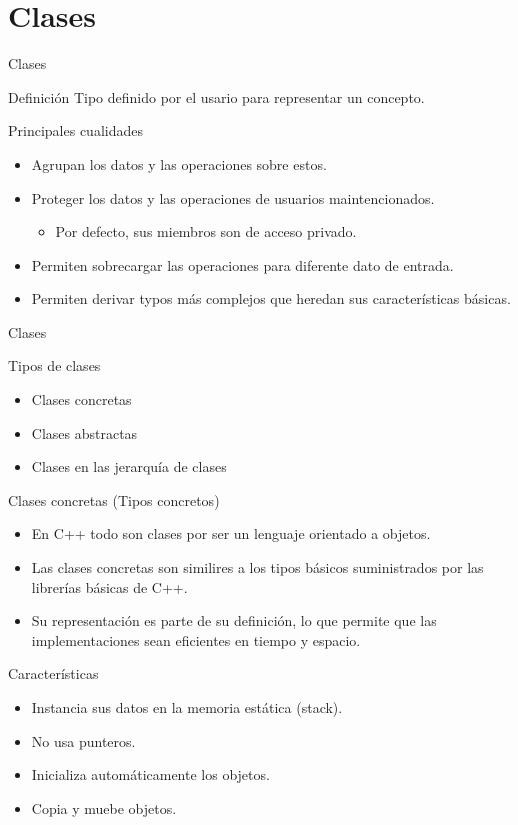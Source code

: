 \documentclass[aspectratio=169,presentation]{beamer}
\begin{document}
\section{Clases}
\label{sec:org2c3c6cc}
\begin{frame}[label={sec:org819730a}]{Clases}
\begin{block}{Definición}
Tipo definido por el usario para representar un concepto.
\end{block}
\begin{block}{Principales cualidades}
\begin{itemize}
\item Agrupan los datos y las operaciones sobre estos.
\item Proteger los datos y las operaciones de usuarios maintencionados.
\begin{itemize}
\item Por defecto, sus miembros son de acceso privado.
\end{itemize}
\item Permiten sobrecargar las operaciones para diferente dato de entrada.
\item Permiten derivar typos más complejos que heredan sus características básicas.
\end{itemize}
\end{block}
\end{frame}
\begin{frame}[label={sec:org1f23314}]{Clases}
\begin{block}{Tipos de clases}
\begin{itemize}
\item Clases concretas
\item Clases abstractas
\item Clases en las jerarquía de clases
\end{itemize}
\end{block}
\end{frame}
\begin{frame}[label={sec:org9b62f40}]{Clases concretas (Tipos concretos)}
\begin{itemize}
\item En C++ todo son clases por ser un lenguaje orientado a objetos.
\item Las clases concretas son similires a los tipos básicos suministrados por las librerías básicas de C++.
\item Su representación es parte de su definición, lo que permite que las implementaciones sean eficientes en tiempo y espacio.
\end{itemize}
\begin{block}{Características}
\begin{itemize}
\item Instancia sus datos en la memoria estática (stack).
\item No usa punteros.
\item Inicializa automáticamente los objetos.
\item Copia y muebe objetos.
\end{itemize}
\end{block}
\end{frame}
\end{document}
